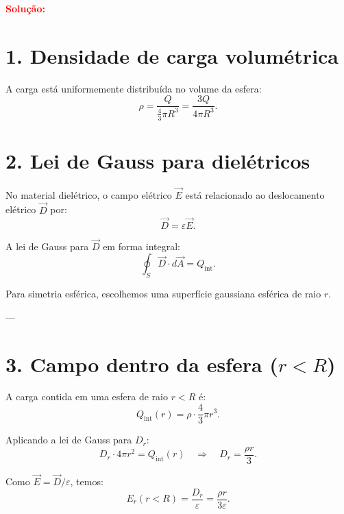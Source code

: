 \begin{flushleft}
\begin{center}
\end{center}

\textcolor{red}{\textbf{Solução:}}\\

\section*{1. Densidade de carga volumétrica}

A carga está uniformemente distribuída no volume da esfera:
\[
\rho = \frac{Q}{\frac{4}{3} \pi R^3} = \frac{3Q}{4\pi R^3}.
\]

\section*{2. Lei de Gauss para dielétricos}

No material dielétrico, o campo elétrico \( \vec{E} \) está relacionado ao deslocamento elétrico \( \vec{D} \) por:
\[
\vec{D} = \varepsilon \vec{E}.
\]

A lei de Gauss para \( \vec{D} \) em forma integral:
\[
\oint_{S} \vec{D} \cdot d\vec{A} = Q_{\text{int}}.
\]

Para simetria esférica, escolhemos uma superfície gaussiana esférica de raio \( r \).  

---

\section*{3. Campo dentro da esfera (\( r < R \))}

A carga contida em uma esfera de raio \( r < R \) é:
\[
Q_{\text{int}}(r) = \rho \cdot \frac{4}{3} \pi r^3.
\]

Aplicando a lei de Gauss para \( D_r \):
\[
D_r \cdot 4\pi r^2 = Q_{\text{int}}(r) \quad \Rightarrow \quad D_r = \frac{\rho r}{3}.
\]

Como \( \vec{E} = \vec{D}/\varepsilon \), temos:
\[
E_r(r<R) = \frac{D_r}{\varepsilon} = \frac{\rho r}{3\varepsilon}.
\]


\end{flushleft}
